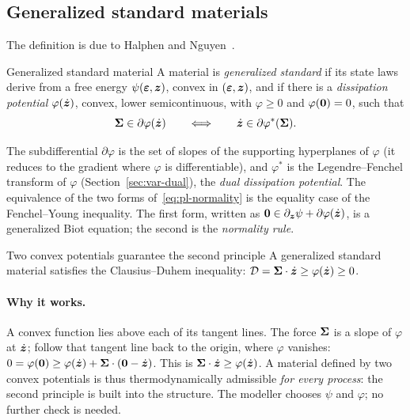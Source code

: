 \subsection{Generalized standard materials}\label{ssec:pl-gsm-def}
%
The definition is due to Halphen and Nguyen~\cite{HalphenNguyen1975}.
\begin{gbox}{Generalized standard material}\label{def:pl-gsm}
A material is \emph{generalized standard} if its state laws derive from a free
energy $\psi(\bm{\varepsilon},\bm{z})$, convex in $(\bm{\varepsilon},\bm{z})$, and if there is a
\emph{dissipation potential} $\varphi(\dot{\bm{z}})$, convex, lower
semicontinuous, with $\varphi\ge0$ and $\varphi(\bm{0})=0$, such that
\begin{equation}\label{eq:pl-normality}
  \bm{\Sigma}\in\partial\varphi(\dot{\bm{z}})
  \qquad\Longleftrightarrow\qquad
  \dot{\bm{z}}\in\partial\varphi^\ast(\bm{\Sigma}).
\end{equation}
\end{gbox}
\noindent The subdifferential $\partial\varphi$ is the set of slopes of the
supporting hyperplanes of $\varphi$ (it reduces to the gradient where
$\varphi$ is differentiable), and $\varphi^\ast$ is the Legendre--Fenchel
transform of $\varphi$ (Section~\ref{sec:var-dual}), the \emph{dual
dissipation potential}. The equivalence of the two forms
of~\eqref{eq:pl-normality} is the equality case of the Fenchel--Young
inequality. The first form, written as
$\bm{0}\in\partial_{\bm{z}}\psi+\partial\varphi(\dot{\bm{z}})$, is a generalized Biot
equation; the second is the \emph{normality rule}.

\begin{gbox}{Two convex potentials guarantee the second principle}\label{prop:pl-gsm-CD}
A generalized standard material satisfies the Clausius--Duhem inequality:
$\mathcal D=\bm{\Sigma}\cdot\dot{\bm{z}}\ge\varphi(\dot{\bm{z}})\ge0$.
\end{gbox}
\paragraph{Why it works.} A convex function lies above each of its tangent
lines. The force $\bm{\Sigma}$ is a slope of $\varphi$ at $\dot{\bm{z}}$; follow that
tangent line back to the origin, where $\varphi$ vanishes:
$0=\varphi(\bm{0})\ge\varphi(\dot{\bm{z}})+\bm{\Sigma}\cdot(\bm{0}-\dot{\bm{z}})$. This is
$\bm{\Sigma}\cdot\dot{\bm{z}}\ge\varphi(\dot{\bm{z}})$.
A material defined by two convex potentials is thus thermodynamically
admissible \emph{for every process}: the second principle is built into the
structure. The modeller chooses $\psi$ and $\varphi$; no further check is
needed.

